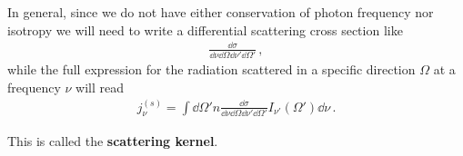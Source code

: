 \documentclass[main.tex]{subfiles}
\begin{document}
In general, since we do not have either conservation of photon frequency nor isotropy we will need to write a differential scattering cross section like 
%
\begin{align}
\frac{ \dd{\sigma }}{ \dd{\nu } \dd{\Omega } \dd{\nu}' \dd{\Omega }'}
\,,
\end{align}
%
while the full expression for the radiation scattered in a specific direction \(\Omega \) at a frequency \(\nu \) will read 
%
\begin{align}
j_\nu^{(s)} = \int \dd{\Omega}' n \frac{ \dd{\sigma }}{ \dd{\nu } \dd{\Omega } \dd{\nu}' \dd{\Omega }'} I_{\nu'} (\Omega') \dd{\nu }
\,. 
\end{align}


This is called the \textbf{scattering kernel}. 
\end{document}
